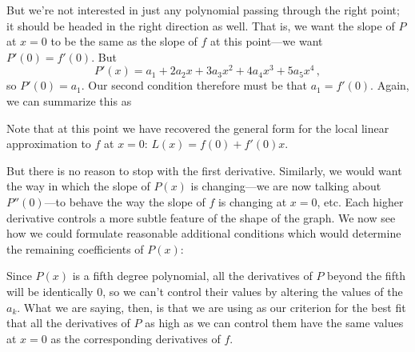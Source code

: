 {{{{\noindent
\begin{center}
\end{center}

But we're 
not interested in just any polynomial passing through the right point;  it should be headed in the right direction as well.  That is, we want the slope of $P$ at $x=0$ to be the same as the slope of $f$ at this point---we want $P'(0)=f'(0).$  But
\[
P'(x) = a_1 + 2a_2x + 3a_3x^2 + 4a_4x^3 + 5a_5x^4 \, ,
\]
so $P'(0)=a_1$.  Our second condition therefore must be that $a_1=f'(0)$.  Again, we can summarize this as

\noindent
\begin{center}
\end{center}

\noindent
Note that at this point we have recovered the general form for the local
linear approximation to $f$ at $x=0$: $L(x) = f(0) + f'(0)x$.

But there is no reason to stop with the first derivative.  Similarly, we
would want the way in which the slope of $P(x)$ is changing---we are now
talking about $P''(0)$---to behave the way the slope of $f$ is changing
at $x=0$, etc.  Each higher derivative controls a more subtle feature of
the shape of the graph.  We now see how we could formulate reasonable
additional conditions which would determine the remaining coefficients of $P(x)$:

\noindent
\begin{center}
\end{center}

Since $P(x)$ is a fifth degree polynomial, all the derivatives of $P$ beyond the fifth will be identically 0, so we can't control their values by altering the values of the $a_k$. What we are saying, then, is that we are using as our
 criterion for the best fit that all the derivatives of $P$ as high as we can control them have the same values at $x=0$ as the corresponding derivatives of $f$. 

}}}}
